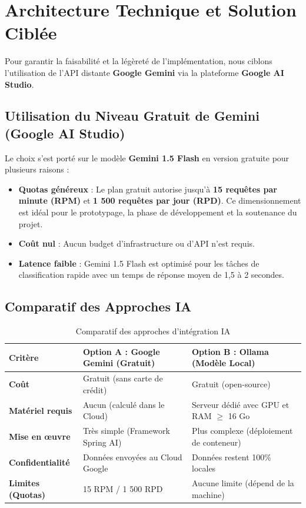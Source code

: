 \documentclass[12pt,a4paper]{article}
\begin{document}
\section{Architecture Technique et Solution Ciblée}
Pour garantir la faisabilité et la légèreté de l'implémentation, nous ciblons l'utilisation de l'API distante \textbf{Google Gemini} via la plateforme \textbf{Google AI Studio}.

\subsection{Utilisation du Niveau Gratuit de Gemini (Google AI Studio)}
Le choix s'est porté sur le modèle \textbf{Gemini 1.5 Flash} en version gratuite pour plusieurs raisons :
\begin{itemize}
    \item \textbf{Quotas généreux} : Le plan gratuit autorise jusqu'à \textbf{15 requêtes par minute (RPM)} et \textbf{1 500 requêtes par jour (RPD)}. Ce dimensionnement est idéal pour le prototypage, la phase de développement et la soutenance du projet.
    \item \textbf{Coût nul} : Aucun budget d'infrastructure ou d'API n'est requis.
    \item \textbf{Latence faible} : Gemini 1.5 Flash est optimisé pour les tâches de classification rapide avec un temps de réponse moyen de 1,5 à 2 secondes.
\end{itemize}

\subsection{Comparatif des Approches IA}
\begin{table}[h]
    \centering
    \caption{Comparatif des approches d'intégration IA}
    \begin{tabular}{lll}
        \toprule
        \textbf{Critère} & \textbf{Option A : Google Gemini (Gratuit)} & \textbf{Option B : Ollama (Modèle Local)} \\
        \midrule
        \textbf{Coût} & Gratuit (sans carte de crédit) & Gratuit (open-source) \\
        \textbf{Matériel requis} & Aucun (calculé dans le Cloud) & Serveur dédié avec GPU et RAM $\ge$ 16 Go \\
        \textbf{Mise en œuvre} & Très simple (Framework Spring AI) & Plus complexe (déploiement de conteneur) \\
        \textbf{Confidentialité} & Données envoyées au Cloud Google & Données restent 100\% locales \\
        \textbf{Limites (Quotas)} & 15 RPM / 1 500 RPD & Aucune limite (dépend de la machine) \\
        \bottomrule
    \end{tabular}
\end{table}
\end{document}
